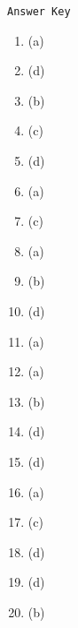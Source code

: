 \begin{center}
\texttt{Answer Key}
\begin{multicols}{5}
\begin{enumerate}
\item (a)
\item (d)
\item (b)
\item (c)
\item (d)
\item (a)
\item (c)
\item (a)
\item (b)
\item (d)
\item (a)
\item (a)
\item (b)
\item (d)
\item (d)
\item (a)
\item (c)
\item (d)
\item (d)
\item (b)
\end{enumerate}
\end{multicols}
\end{center}
